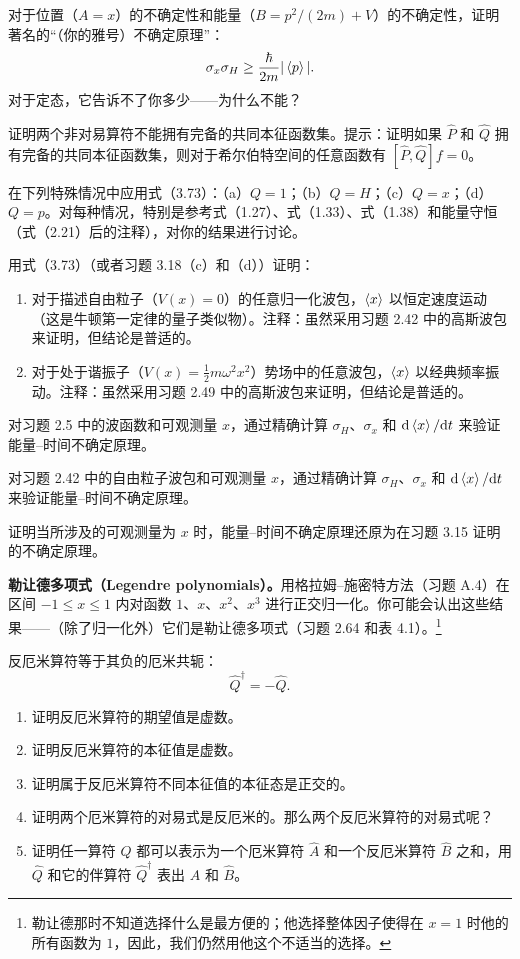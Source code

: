对于位置（$A=x$）的不确定性和能量（$B=p^2/(2m)+V$）的不确定性，证明著名的“（你的雅号）不确定原理”：
\[
\sigma_x\sigma_H\geq\frac{\hbar}{2m}|\left\langle p\right\rangle|.
\]
对于定态，它告诉不了你多少——为什么不能？
\vfill

证明两个非对易算符不能拥有完备的共同本征函数集。提示：证明如果 $\hat P$ 和 $\hat Q$ 拥有完备的共同本征函数集，则对于希尔伯特空间的任意函数有 $[\hat P,\hat Q]f=0$。
\vfill

在下列特殊情况中应用式（3.73）：（a）$Q=1$；（b）$Q=H$；（c）$Q=x$；（d）$Q=p$。对每种情况，特别是参考式（1.27）、式（1.33）、式（1.38）和能量守恒（式（2.21）后的注释），对你的结果进行讨论。
\vfill

用式（3.73）（或者习题 3.18（c）和（d））证明：
\begin{enumerate}
\item 对于描述自由粒子（$V(x)=0$）的任意归一化波包，$\left\langle x\right\rangle$ 以恒定速度运动（这是牛顿第一定律的量子类似物）。注释：虽然采用习题 2.42 中的高斯波包来证明，但结论是普适的。
\item 对于处于谐振子（$V(x)=\frac12m\omega^2x^2$）势场中的任意波包，$\left\langle x\right\rangle$ 以经典频率振动。注释：虽然采用习题 2.49 中的高斯波包来证明，但结论是普适的。
\end{enumerate}
\vfill

对习题 2.5 中的波函数和可观测量 $x$，通过精确计算 $\sigma_H$、$\sigma_x$ 和 $\mathrm{d}\left\langle x\right\rangle/\mathrm{d} t$ 来验证能量--时间不确定原理。
\vfill

对习题 2.42 中的自由粒子波包和可观测量 $x$，通过精确计算 $\sigma_H$、$\sigma_x$ 和 $\mathrm{d}\left\langle x\right\rangle/\mathrm{d} t$ 来验证能量--时间不确定原理。
\vfill

证明当所涉及的可观测量为 $x$ 时，能量--时间不确定原理还原为在习题 3.15 证明的不确定原理。
\vfill


\textbf{勒让德多项式（Legendre polynomials）。}用格拉姆--施密特方法（习题 A.4）在区间 $-1\leq x\leq1$ 内对函数 $1$、$x$、$x^2$、$x^3$ 进行正交归一化。你可能会认出这些结果——（除了归一化外）它们是勒让德多项式（习题 2.64 和表 4.1）。\footnote{勒让德那时不知道选择什么是最方便的；他选择整体因子使得在 $x=1$ 时他的所有函数为 $1$，因此，我们仍然用他这个不适当的选择。}
\vfill

反厄米算符等于其负的厄米共轭：
\[
\hat Q^\dagger=-\hat Q.
\]
\begin{enumerate}
\item 证明反厄米算符的期望值是虚数。
\item 证明反厄米算符的本征值是虚数。
\item 证明属于反厄米算符不同本征值的本征态是正交的。
\item 证明两个厄米算符的对易式是反厄米的。那么两个反厄米算符的对易式呢？
\item 证明任一算符 $\hat Q$ 都可以表示为一个厄米算符 $\hat A$ 和一个反厄米算符 $\hat B$ 之和，用 $\hat Q$ 和它的伴算符 $\hat Q^\dagger$ 表出 $\hat A$ 和 $\hat B$。
\end{enumerate}
\vfill

